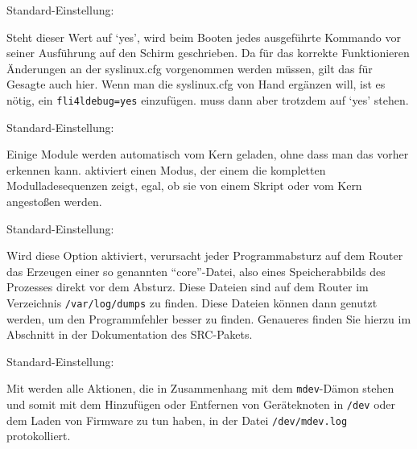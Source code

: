 \begin{description}

    
    Standard-Einstellung: 

    Steht dieser Wert auf `yes', wird beim Booten jedes ausgeführte
    Kommando vor seiner Ausführung auf den Schirm geschrieben. Da für
    das korrekte Funktionieren Änderungen an der syslinux.cfg
    vorgenommen werden müssen, gilt das für 
    Gesagte auch hier. Wenn man die syslinux.cfg von Hand ergänzen will,
    ist es nötig, ein \verb+fli4ldebug=yes+ einzufügen.  muss
    dann aber trotzdem auf `yes' stehen.

    
    Standard-Einstellung: 
    
    Einige Module werden automatisch vom Kern geladen, ohne dass man das
    vorher erkennen kann.  aktiviert einen
    Modus, der einem die kompletten Modulladesequenzen zeigt, egal, ob
    sie von einem Skript oder vom Kern angestoßen werden.

    
    Standard-Einstellung: 
    
    Wird diese Option aktiviert, verursacht jeder Programmabsturz auf dem
    Router das Erzeugen einer so genannten ``core''-Datei, also eines
    Speicherabbilds des Prozesses direkt vor dem Absturz. Diese Dateien sind
    auf dem Router im Verzeichnis \texttt{/var/log/dumps} zu finden. Diese
    Dateien können dann genutzt werden, um den Programmfehler besser zu finden.
    Genaueres finden Sie hierzu im Abschnitt  in der Dokumentation des SRC-Pakets.

    
    Standard-Einstellung: 
    
    Mit  werden alle Aktionen, die in Zusammenhang mit
    dem \texttt{mdev}-Dämon stehen und somit mit dem Hinzufügen oder Entfernen
    von Geräteknoten in \texttt{/dev} oder dem Laden von Firmware zu tun haben,
    in der Datei \texttt{/dev/mdev.log} protokolliert.


\end{description}
